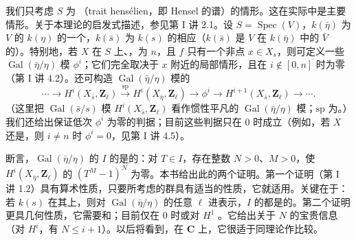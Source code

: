 我们只考虑 $S$ 为 （trait hensélien，即 Hensel 的谱）的情形。这在实际中是主要情形。关于本理论的启发式描述，参见第 I 讲 2.1。设 $S=\operatorname{Spec}(V)$，$k(\bar\eta)$ 为 $V$ 的 $k(\eta)$ 的一个，$k(\bar s)$ 为 $k(s)$ 的相应（$k(\bar s)$ 是 $V$ 在 $k(\bar\eta)$ 中的 $\bar V$ 的）。特别地，若 $X$ 在 $S$ 上、，为 $n$，且 $f$ 只有一个非点 $x\in X_s$，则可定义一些 $\operatorname{Gal}(\bar\eta/\eta)$ 模 $\phi^i$；它们完全取决于 $x$ 附近的局部情形，且在 $i\notin[0,n]$ 时为零（第 I 讲 4.2）。还可构造 $\operatorname{Gal}(\bar\eta/\eta)$ 模的
\[
\cdots\longrightarrow H^i(X_{\bar s},\mathbf Z_\ell)
\xrightarrow{\mathrm{sp}}H^i(X_{\bar\eta},\mathbf Z_\ell)
\longrightarrow\phi^i\longrightarrow H^{i+1}(X_{\bar s},\mathbf Z_\ell)
\longrightarrow\cdots .
\]
（这里把 $\operatorname{Gal}(\bar s/s)$ 模 $H^i(X_{\bar s},\mathbf Z_\ell)$ 看作惯性平凡的 $\operatorname{Gal}(\bar\eta/\eta)$ 模；$\mathrm{sp}$ 为。）我们还给出保证低次 $\phi^i$ 为零的判据；目前这些判据只在 $0$ 时成立（例如，若 $X$ 还是，则 $i\ne n$ 时 $\phi^i=0$，见第 I 讲 4.5）。

断言，$\operatorname{Gal}(\bar\eta/\eta)$ 的 $I$ 的是的：对 $T\in I$，存在整数 $N>0$、$M>0$，使 $H^i(X_{\bar\eta},\mathbf Z_\ell)$ 的 $(T^M-1)^N$ 为零。本书给出此的两个证明。第一个证明（第 I 讲 1.2）具有算术性质，只要所考虑的群具有适当的性质，它就适用。关键在于：若 $k(s)$ 在其上，则对 $\operatorname{Gal}(\bar\eta/\eta)$ 的任意 $\ell$ 进表示，$I$ 的都是的。第二个证明更具几何性质，它需要和；目前仅在 $0$ 时或对 $H^1$ 。它给出关于 $N$ 的宝贵信息（对 $H^i$，有 $N\le i+1$）。以后将看到，在 $\mathbf C$ 上，它很适于同理论作比较。

